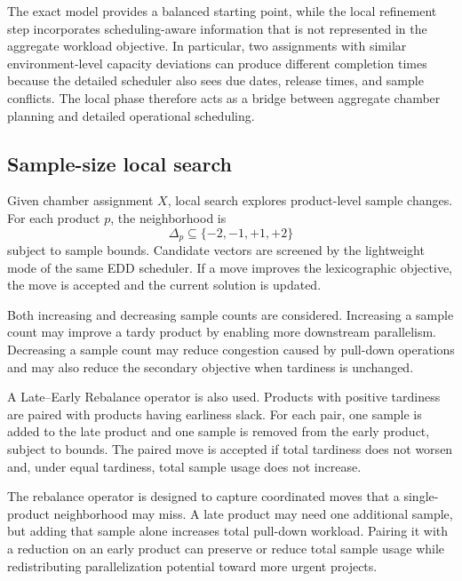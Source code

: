 \documentclass[11pt]{article}
\begin{document}
The exact model provides a balanced starting point, while the local refinement step incorporates scheduling-aware information that is not represented in the aggregate workload objective. In particular, two assignments with similar environment-level capacity deviations can produce different completion times because the detailed scheduler also sees due dates, release times, and sample conflicts. The local phase therefore acts as a bridge between aggregate chamber planning and detailed operational scheduling.

\subsection{Sample-size local search}
\label{subsec:sample_optimization}

Given chamber assignment \(X\), local search explores product-level sample changes. For each product \(p\), the neighborhood is
\[
\Delta_p \subseteq \{-2,-1,+1,+2\}
\]
subject to sample bounds. Candidate vectors are screened by the lightweight mode of the same EDD scheduler. If a move improves the lexicographic objective, the move is accepted and the current solution is updated.

Both increasing and decreasing sample counts are considered. Increasing a sample count may improve a tardy product by enabling more downstream parallelism. Decreasing a sample count may reduce congestion caused by pull-down operations and may also reduce the secondary objective when tardiness is unchanged.

A Late--Early Rebalance operator is also used. Products with positive tardiness are paired with products having earliness slack. For each pair, one sample is added to the late product and one sample is removed from the early product, subject to bounds. The paired move is accepted if total tardiness does not worsen and, under equal tardiness, total sample usage does not increase.

The rebalance operator is designed to capture coordinated moves that a single-product neighborhood may miss. A late product may need one additional sample, but adding that sample alone increases total pull-down workload. Pairing it with a reduction on an early product can preserve or reduce total sample usage while redistributing parallelization potential toward more urgent projects.
\end{document}
